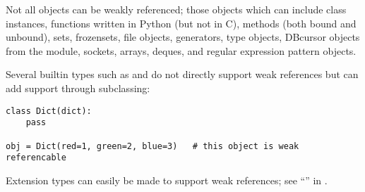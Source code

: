 Not all objects can be weakly referenced; those objects which can
include class instances, functions written in Python (but not in C),
methods (both bound and unbound), sets, frozensets, file objects,
generators, type objects, DBcursor objects from the  module,
sockets, arrays, deques, and regular expression pattern objects.

Several builtin types such as  and  do not
directly support weak references but can add support through subclassing:

\begin{verbatim}
class Dict(dict):
    pass

obj = Dict(red=1, green=2, blue=3)   # this object is weak referencable
\end{verbatim}

Extension types can easily be made to support weak references; see
``'' in
.

